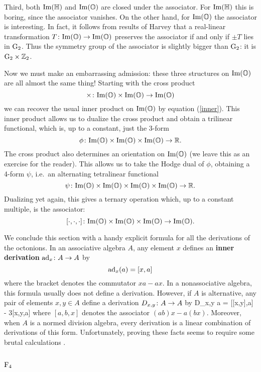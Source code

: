 Third, both ${\rm Im}({\mathbb H})$ and ${\rm Im}({\mathbb O})$ are closed under the associator.    
For ${\rm Im}({\mathbb H})$ this is boring, since the associator vanishes.  On  the  
other hand, for ${\rm Im}({\mathbb O})$ the associator is interesting.  In fact, it  
follows from results of Harvey \cite{Harvey} that a real-linear  
transformation $T \colon {\rm Im}({\mathbb O}) \to {\rm Im}({\mathbb O})$ preserves the associator  
if and only if $\pm T$ lies in ${\rm G}_2$.  Thus the symmetry group of the
associator is slightly bigger than ${\rm G}_2$: it is ${\rm G}_2 \times {\mathbb Z}_2$.  
   
Now we must make an embarrassing admission: these three structures on  
${\rm Im}({\mathbb O})$ are all almost the same thing!   Starting with the cross
product   
\[    \times \colon {\rm Im}({\mathbb O}) \times {\rm Im}({\mathbb O}) \to {\rm Im}({\mathbb O})  \]   
we can recover the usual inner product on ${\rm Im}({\mathbb O})$ by equation   
(\ref{inner}).  This inner product allows us to dualize the cross
product and obtain a trilinear functional, which is, up to a constant,   
just the 3-form    
\[     \phi \colon {\rm Im}({\mathbb O}) \times {\rm Im}({\mathbb O}) \times {\rm Im}({\mathbb O}) \to {\mathbb R} .\]   
The cross product also determines an orientation on ${\rm Im}({\mathbb O})$ (we leave   
this as an exercise for the reader).  This allows us to take the Hodge   
dual of $\phi$, obtaining a 4-form $\psi$, i.e.\ an alternating   
tetralinear functional    
\[     \psi \colon {\rm Im}({\mathbb O}) \times {\rm Im}({\mathbb O}) \times {\rm Im}({\mathbb O}) \times {\rm Im}({\mathbb O})   
\to {\mathbb R} .\]   
Dualizing yet again, this gives a ternary operation which, up   
to a constant multiple, is the associator:   
\[  [\cdot, \cdot, \cdot] \colon {\rm Im}({\mathbb O}) \times {\rm Im}({\mathbb O}) \times {\rm Im}({\mathbb O})    
\to {\rm Im}({\mathbb O}) .\]   
   
We conclude this section with a handy explicit formula for all the   
derivations of the octonions.    In an associative algebra $A$, any   
element $x$ defines an {\bf inner derivation} ${\rm ad}_x \colon A \to A$ by   
\[      {\rm ad}_x (a) = [x,a]  \]   
where the bracket denotes the commutator $xa - ax$.   
In a nonassociative algebra, this formula usually does not define   
a derivation.  However, if $A$ is alternative, any pair of elements   
$x,y \in A$ define a derivation $D_{x,y} \colon A \to A$ by   
\be       D_{x,y} a = [[x,y],a] - 3[x,y,a]          \label{D}  \ee   
where $[a,b,x]$ denotes the associator $(ab)x - a(bx)$.   Moreover, 
when $A$ is a normed division algebra, every derivation is a linear 
combination of derivations of this form.  Unfortunately, proving these 
facts seems to require some brutal calculations \cite{Schafer}.  
   
\subsection{${\rm F}_4$}   \label{F4}   

